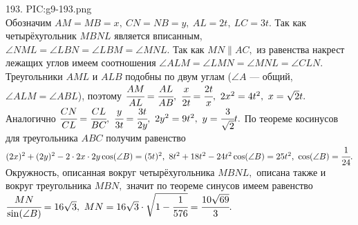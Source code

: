 193. {{PIC:g9-193.png}}\\
Обозначим $AM=MB=x,\ CN=NB=y,\ AL=2t,\ LC=3t.$ Так как четырёхугольник $MBNL$ является вписанным, $\angle NML=\angle LBN=\angle LBM=\angle MNL.$ Так как $MN\parallel AC,$ из равенства накрест лежащих углов имеем соотношения $\angle ALM=\angle LMN=\angle MNL=\angle CLN.$ Треугольники $AML$ и $ALB$ подобны по двум углам ($\angle A$ --- общий, $\angle ALM=\angle ABL$), поэтому $\cfrac{AM}{AL}=\cfrac{AL}{AB},\ \cfrac{x}{2t}=\cfrac{2t}{x},\ 2x^2=4t^2,\ x=\sqrt{2}t.$ Аналогично $\cfrac{CN}{CL}=\cfrac{CL}{BC},\ \cfrac{y}{3t}=\cfrac{3t}{2y},\ 2y^2=9t^2,\ y=\cfrac{3}{\sqrt{2}}t.$ По теореме косинусов для треугольника $ABC$ получим равенство $(2x)^2+(2y)^2-2\cdot2x\cdot2y\cos(\angle B)=(5t)^2,\
8t^2+18t^2-24t^2\cos(\angle B)=25t^2,\ \cos(\angle B)=\cfrac{1}{24}.$ Окружность, описанная вокруг четырёхугольника $MBNL,$ описана также и вокруг треугольника $MBN,$ значит по теореме синусов имеем равенство $\cfrac{MN}{\sin(\angle B)}=16\sqrt{3},\ MN=16\sqrt{3}\cdot\sqrt{1-\cfrac{1}{576}}=\cfrac{10\sqrt{69}}{3}.$\\
